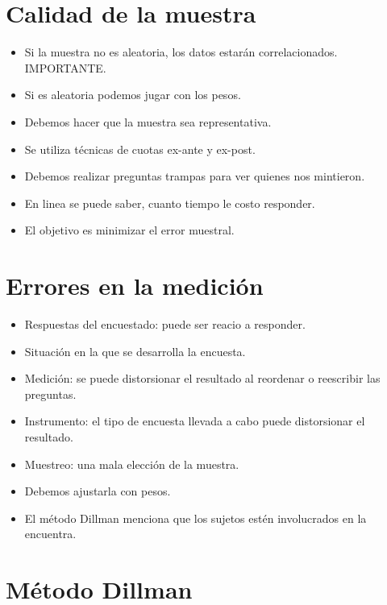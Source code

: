 \section{Calidad de la muestra}

\begin{itemize}
    \item Si la muestra no es aleatoria, los datos estarán correlacionados. IMPORTANTE.
    \item Si es aleatoria podemos jugar con los pesos.
    \item Debemos hacer que la muestra sea representativa.
    \item Se utiliza técnicas de cuotas ex-ante y ex-post.
    \item Debemos realizar preguntas trampas para ver quienes nos mintieron.
    \item En linea se puede saber, cuanto tiempo le costo responder.
    \item El objetivo es minimizar el error muestral.
\end{itemize}

\section{Errores en la medición}

\begin{itemize}
    \item Respuestas del encuestado: puede ser reacio a responder.
    \item Situación en la que se desarrolla la encuesta.
    \item Medición: se puede distorsionar el resultado al reordenar o reescribir las preguntas.
    \item Instrumento: el tipo de encuesta llevada a cabo puede distorsionar el resultado.
    \item Muestreo: una mala elección de la muestra.
    \item Debemos ajustarla con pesos.
    \item El método Dillman menciona que los sujetos estén involucrados en la encuentra.
\end{itemize}


\section{Método Dillman}


